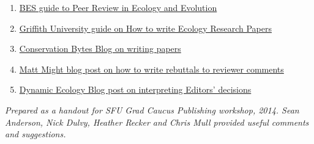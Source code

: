 \documentclass[11pt,]{article}
\begin{document}
\begin{enumerate}
\def\labelenumi{\arabic{enumi}.}
\itemsep1pt\parskip0pt
\item
  \href{http://www.britishecologicalsociety.org/wp-content/uploads/Publ_Peer-Review-Booklet.pdf}{BES
  guide to Peer Review in Ecology and Evolution}
\item
  \href{https://www.google.com/url?sa=t\&rct=j\&q=\&esrc=s\&source=web\&cd=1\&cad=rja\&uact=8\&ved=0CCgQFjAA\&url=http\%3A\%2F\%2Fwww.griffith.edu.au\%2F__data\%2Fassets\%2Fpdf_file\%2F0007\%2F435526\%2FWriting-Ecology-Research-Papers-July-2012.pdf\&ei=QHAzU97cL4XtoASU44DwBQ\&usg=AFQjCNETmGdH64aWIK9cdKO-g2i9LTl2nA\&sig2=bNmGEzkhR8Ucz_pzrd1uAQ\&bvm=bv.63808443,d.cGU}{Griffith
  University guide on How to write Ecology Research Papers}
\item
  \href{http://conservationbytes.com/2012/10/22/how-to-write-a-scientific-paper/}{Conservation
  Bytes Blog on writing papers}
\item
  \href{http://matt.might.net/articles/peer-review-rebuttals}{Matt Might
  blog post on how to write rebuttals to reviewer comments}
\item
  \href{http://dynamicecology.wordpress.com/2014/03/12/tell-me-again-what-major-revisions-are/}{Dynamic
  Ecology Blog post on interpreting Editors' decisions} 
\end{enumerate}

\emph{Prepared as a handout for SFU Grad Caucus Publishing workshop,
2014. Sean Anderson, Nick Dulvy, Heather Recker and Chris Mull provided
useful comments and suggestions.}
\end{document}
